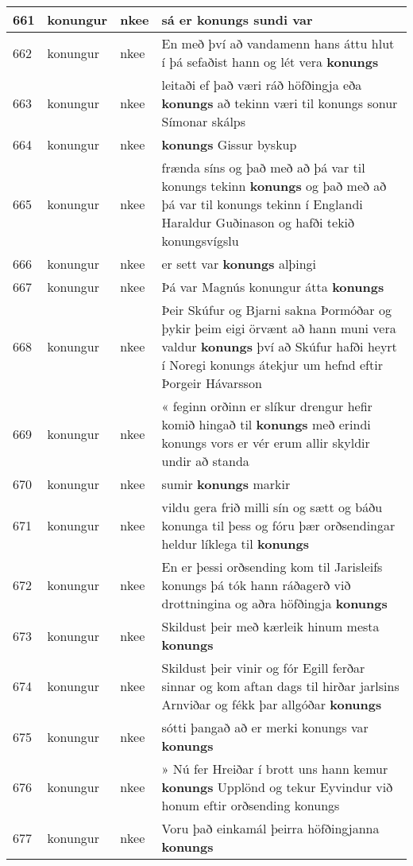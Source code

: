 \documentclass{article}
\begin{document}
\begin{longtable}{p{1cm}|p{1cm}|p{1cm}|p{13cm}}
\hline
661&konungur&nkee&sá er \textbf{konungs} sundi var\\
\hline
662&konungur&nkee&En með því að vandamenn hans áttu hlut í þá sefaðist hann og lét vera \textbf{konungs} \\
\hline
663&konungur&nkee&leitaði ef það væri ráð höfðingja eða \textbf{konungs} að tekinn væri til konungs sonur Símonar skálps\\
\hline
664&konungur&nkee& \textbf{konungs} Gissur byskup\\
\hline
665&konungur&nkee&frænda síns og það með að þá var til konungs tekinn \textbf{konungs} og það með að þá var til konungs tekinn í Englandi Haraldur Guðinason og hafði tekið konungsvígslu\\
\hline
666&konungur&nkee&er sett var \textbf{konungs} alþingi\\
\hline
667&konungur&nkee&Þá var Magnús konungur átta \textbf{konungs} \\
\hline
668&konungur&nkee&Þeir Skúfur og Bjarni sakna Þormóðar og þykir þeim eigi örvænt að hann muni vera valdur \textbf{konungs} því að Skúfur hafði heyrt í Noregi konungs átekjur um hefnd eftir Þorgeir Hávarsson\\
\hline
669&konungur&nkee&« feginn orðinn er slíkur drengur hefir komið hingað til \textbf{konungs} með erindi konungs vors er vér erum allir skyldir undir að standa\\
\hline
670&konungur&nkee&sumir \textbf{konungs} markir\\
\hline
671&konungur&nkee&vildu gera frið milli sín og sætt og báðu konunga til þess og fóru þær orðsendingar heldur líklega til \textbf{konungs} \\
\hline
672&konungur&nkee&En er þessi orðsending kom til Jarisleifs konungs þá tók hann ráðagerð við drottningina og aðra höfðingja \textbf{konungs} \\
\hline
673&konungur&nkee&Skildust þeir með kærleik hinum mesta \textbf{konungs} \\
\hline
674&konungur&nkee&Skildust þeir vinir og fór Egill ferðar sinnar og kom aftan dags til hirðar jarlsins Arnviðar og fékk þar allgóðar \textbf{konungs} \\
\hline
675&konungur&nkee&sótti þangað að er merki konungs var \textbf{konungs} \\
\hline
676&konungur&nkee&» Nú fer Hreiðar í brott uns hann kemur \textbf{konungs} Upplönd og tekur Eyvindur við honum eftir orðsending konungs\\
\hline
677&konungur&nkee&Voru það einkamál þeirra höfðingjanna \textbf{konungs} \\

\end{longtable}
\end{document}
